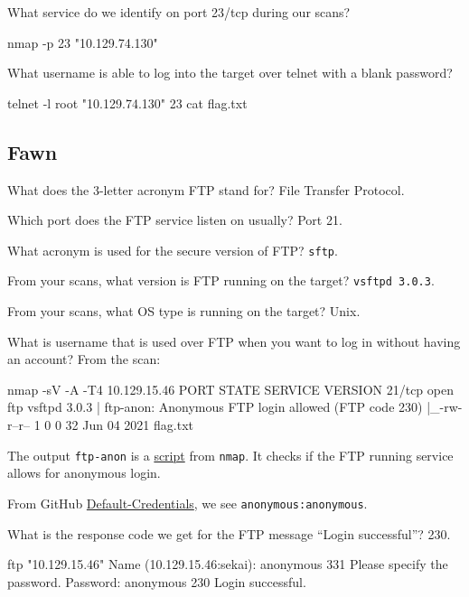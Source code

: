 \documentclass[a4paper,10pt]{article}
\begin{document}
What service do we identify on port 23/tcp during our scans?
\begin{bash}
nmap -p 23 "10.129.74.130"
\end{bash}

What username is able to log into the target over telnet with a blank password?
\begin{bash}
telnet -l root "10.129.74.130" 23
cat flag.txt
\end{bash}

\subsection{Fawn \faLinux}

What does the 3-letter acronym FTP stand for? File Transfer Protocol.

Which port does the FTP service listen on usually? Port 21.

What acronym is used for the secure version of FTP? \texttt{sftp}.

From your scans, what version is FTP running on the target? \texttt{vsftpd 3.0.3}.

From your scans, what OS type is running on the target? Unix.

What is username that is used over FTP when you want to log in without having an account? From the scan:
\begin{bash}
nmap -sV -A -T4 10.129.15.46
PORT   STATE SERVICE VERSION
21/tcp open  ftp     vsftpd 3.0.3
| ftp-anon: Anonymous FTP login allowed (FTP code 230)
|_-rw-r--r--    1 0        0              32 Jun 04  2021 flag.txt
\end{bash}

The output \texttt{ftp-anon} is a \href{https://nmap.org/nsedoc/scripts/ftp-anon.html}{script} from \texttt{nmap}. It checks if the FTP running service allows for anonymous login.

From GitHub \href{https://github.com/danielmiessler/SecLists/blob/master/Passwords/Default-Credentials/ftp-betterdefaultpasslist.txt}{Default-Credentials}, we see \texttt{anonymous:anonymous}.

What is the response code we get for the FTP message ``Login successful''? 230.
\begin{bash}
ftp "10.129.15.46"
Name (10.129.15.46:sekai): anonymous
331 Please specify the password.
Password: anonymous
230 Login successful.
\end{bash}
\end{document}
